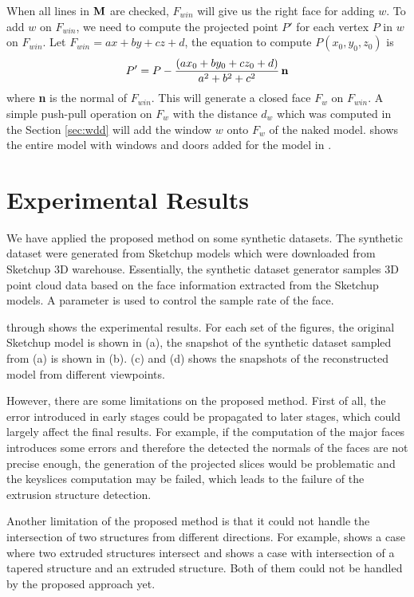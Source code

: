 When all lines in ${\bf M}$ are checked, $F_{win}$ will give us the right face for adding $w$.
To add $w$ on $F_{win}$, we need to compute the projected point $P'$ for each vertex $P$ in $w$ on $F_{win}$.
Let $F_{win} = ax + by + cz + d$, the equation to compute $P(x_0, y_0, z_0)$ is
\begin{equation*} %
P' = P - \frac{(ax_0+by_0+cz_0+d)}{a^2+b^2+c^2}\,{\bf n}
\end{equation*}
where {\bf n} is the normal of $F_{win}$.
This will generate a closed face $F_w$ on $F_{win}$. 
A simple push-pull operation on $F_w$ with the distance $d_w$ which was computed in the Section \ref{sec:wdd} 
will add the window $w$ onto $F_w$ of the naked model.
 shows the entire model with windows and doors added for the model in .


\section{Experimental Results}

We have applied the proposed method on some synthetic datasets. The synthetic dataset were generated
from Sketchup models which were downloaded from Sketchup 3D warehouse. Essentially, the synthetic
dataset generator samples 3D point cloud data based on the face information extracted from the
Sketchup models. A parameter is used to control the sample rate of the face.

 through  shows the experimental results. For each set of the figures,
the original Sketchup model is shown in (a), the snapshot of the synthetic dataset sampled from (a)
is shown in (b). (c) and (d) shows the snapshots of the reconstructed model from different viewpoints.

However, there are some limitations on the proposed method. First of all, the error introduced in
early stages could be propagated to later stages, which could largely affect the final results.
For example, if the computation of the major faces introduces some errors and therefore the detected
the normals of the faces are not precise enough, the generation of the projected slices would be
problematic and the keyslices computation may be failed, which leads to the failure of the extrusion
structure detection.

Another limitation of the proposed method is that it could not handle the intersection of two
structures from different directions. For example,  shows a case where two extruded
structures intersect and  shows a case with intersection of a tapered structure and
an extruded structure. Both of them could not be handled by the proposed approach yet.

